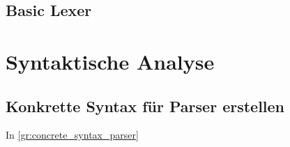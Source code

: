 
\subsection{Basic Lexer}
\section{Syntaktische Analyse}
\subsection{Konkrette Syntax für Parser erstellen}
In \ref{gr:concrete_syntax_parser}

